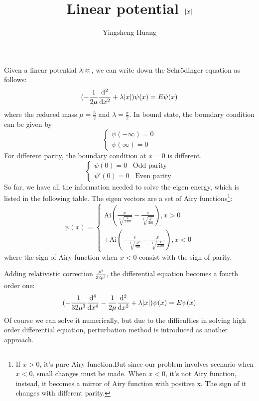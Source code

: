 \documentclass{article}
\title{Linear potential $\abs{x}$}
\author{Yingsheng Huang}
\begin{document}
\maketitle
Given a linear potential $\lambda\abs{x}$, we can write down the Schr\"odinger equation as follows:
\begin{equation}\label{sch}
  (-\frac{1}{2\mu}\dv[2]{x}+\lambda\abs{x})\psi(x)=E\psi(x)
\end{equation}
where the reduced mass $\mu=\frac{5}{2}$ and $\lambda=\frac{\pi}{2}$. In bound state, the boundary condition can be given by
\begin{equation}
\begin{cases}
\psi(-\infty)=0\\
\psi(\infty)=0
\end{cases}
\end{equation}
For different parity, the boundary condition at $x=0$ is different.
\begin{equation}
  \begin{cases}
\psi(0)=0\;\;\;\text{Odd parity}\\
\psi'(0)=0\;\;\;\text{Even parity}
  \end{cases}
\end{equation}
So far, we have all the information needed to solve the eigen energy, which is listed in the following table. The eigen vectors are a set of Airy functions\footnote{If $x>0$, it's pure Airy function.But since our problem involves scenario when $x<0$, small changes must be made. When $x<0$, it's not Airy function, instead, it becomes a mirror of Airy function with positive x. The sign of it changes with different parity.}:
\begin{equation}
\psi(x)=
  \begin{cases}
  \text{Ai}\left(\frac{x}{\sqrt[3]{\frac{1}{2 \lambda  m}}}-\frac{e}{\sqrt[3]{\frac{\lambda ^2}{2 m}}}\right), x>0\\
  \pm \text{Ai}\left(-\frac{e}{\sqrt[3]{\frac{\lambda ^2}{2 m}}}-\frac{x}{\sqrt[3]{\frac{1}{2 \lambda  m}}}\right), x<0
  \end{cases}
\end{equation}
where the sign of Airy function when $x<0$ consist with the sign of parity.

Adding relativistic correction $\frac{p^4}{32\mu^3}$, the differential equation becomes a fourth order one:
\begin{equation}\label{sch}
  (-\frac{1}{32\mu^3}\dv[4]{x}-\frac{1}{2\mu}\dv[2]{x}+\lambda\abs{x})\psi(x)=E\psi(x)
\end{equation}
Of course we can solve it numerically, but due to the difficulties in solving high order differential equation, perturbation method is introduced as another approach.
\end{document}

